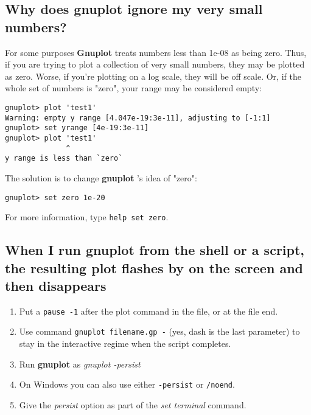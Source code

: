 \documentclass[a4paper,11pt]{article}
\newcommand{\gnuplot}{\textbf{gnuplot }}
\newcommand{\Gnuplot}{\textbf{Gnuplot }}
\begin{document}
\subsection{Why does \gnuplot ignore my very small numbers?}


For some purposes \Gnuplot{} treats numbers less than 1e-08 as being zero.
Thus, if you are trying to plot a collection of very small
numbers, they may be plotted as zero. Worse, if you're plotting
on a log scale, they will be off scale. Or, if the whole set of
numbers is "zero", your range may be considered empty:

\small
\begin{verbatim}
gnuplot> plot 'test1'
Warning: empty y range [4.047e-19:3e-11], adjusting to [-1:1]
gnuplot> set yrange [4e-19:3e-11]
gnuplot> plot 'test1'
              ^
y range is less than `zero`
\end{verbatim}
\normalsize

The solution is to change \gnuplot's idea of "zero":
\small
\begin{verbatim}
gnuplot> set zero 1e-20
\end{verbatim}
\normalsize

For more information, type \verb+help set zero+.


\subsection{When I run \gnuplot from the shell or a script, the resulting plot flashes by on the screen and then disappears}

\begin{enumerate}
\item Put a \verb+pause -1+ after the plot command in the file, or at the file end.

\item Use command \verb+gnuplot filename.gp -+ (yes, dash is the last
parameter) to stay in the interactive regime when the script completes.

\item Run \gnuplot as \textit{gnuplot -persist}

\item On Windows you can also use either \verb+-persist+ or \verb+/noend+.

\item Give the \textit{persist} option as part of the \textit{set terminal} command.
\end{enumerate}
\end{document}
